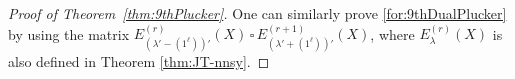 \documentclass[12pt]{amsart}%
\theoremstyle{definition}
\newtheorem{remark}[theorem]{Remark}
\DeclareMathOperator{\add}{add}
\DeclareMathOperator{\rem}{rem}
\begin{document}
\begin{proof}[Proof of Theorem~\ref{thm:9thPlucker}]

One can similarly prove \eqref{for:9thDualPlucker}
by using the matrix 
$E_{(\lambda'-(1^{\ell}))'}^{(r)}(X)\,\square\,E_{(\lambda'+(1^{\ell}))'}^{(r+1)}(X)$,
where $E_{\lambda}^{(r)}(X)$ is also defined in Theorem \ref{thm:JT-nnsy}.
\end{proof}

\end{document}
